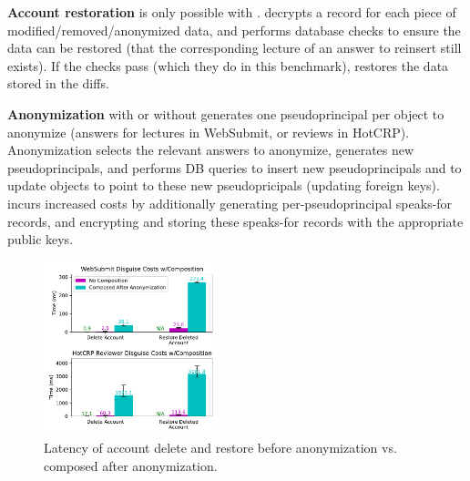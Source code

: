 \textbf{Account restoration} is only possible with \sys. \sys decrypts a record for each
piece of modified/removed/anonymized data, and performs database checks to ensure the data can be restored
(\eg that the corresponding lecture of an answer to reinsert still exists). If the checks pass
(which they do in this benchmark), \sys restores the data stored in the diffs.

\textbf{Anonymization} with or without \sys generates one pseudoprincipal per object to anonymize
(\eg answers for lectures in WebSubmit, or reviews in HotCRP). Anonymization selects the relevant answers
to anonymize, generates new pseudoprincipals, and performs DB queries to insert new pseudoprincipals
and to update objects to point to these new pseudopricipals (\eg updating foreign keys).
\sys incurs increased costs by additionally generating per-pseudoprincipal speaks-for records, and
encrypting and storing these speaks-for records with the appropriate public keys.

\begin{figure}[t]
    \centering
    \includegraphics[width=0.45\textwidth]{figs/composition_stats}
    \caption{Latency of account delete and restore before anonymization vs. composed after anonymization.}
    \label{f:composition}
\end{figure}

